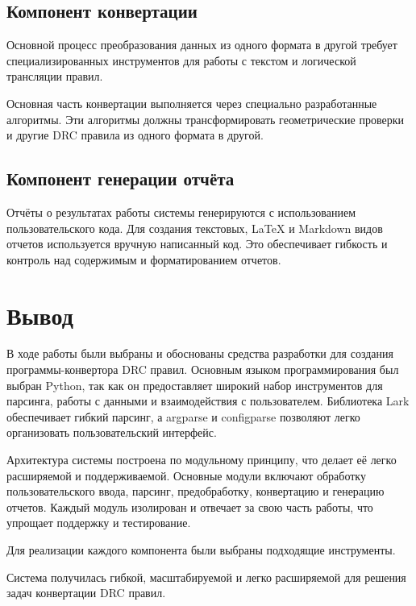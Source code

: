 \subsection{Компонент конвертации}

Основной процесс преобразования данных из одного формата в другой
требует специализированных инструментов
для работы с текстом и логической трансляции правил.\par
Основная часть конвертации выполняется
через специально разработанные алгоритмы.
Эти алгоритмы должны трансформировать геометрические проверки
и другие DRC правила из одного формата в другой.

\subsection{Компонент генерации отчёта}

Отчёты о результатах работы системы генерируются
с использованием пользовательского кода.
Для создания текстовых, LaTeX и Markdown видов отчетов используется
вручную написанный код.
Это обеспечивает гибкость и контроль над содержимым и форматированием отчетов.

\clearpage

\section*{\LARGE Вывод}

В ходе работы были выбраны и обоснованы средства разработки
для создания программы-конвертора DRC правил.
Основным языком программирования был выбран Python,
так как он предоставляет широкий набор инструментов для парсинга,
работы с данными и взаимодействия с пользователем.
Библиотека Lark обеспечивает гибкий парсинг,
а argparse и configparse позволяют легко организовать
пользовательский интерфейс.\par
Архитектура системы построена по модульному принципу,
что делает её легко расширяемой и поддерживаемой.
Основные модули включают обработку пользовательского ввода, парсинг, предобработку, конвертацию и генерацию отчетов.
Каждый модуль изолирован и отвечает за свою часть работы,
что упрощает поддержку и тестирование.\par
Для реализации каждого компонента были выбраны подходящие инструменты.\par
Система получилась гибкой, масштабируемой
и легко расширяемой для решения задач конвертации DRC правил.

